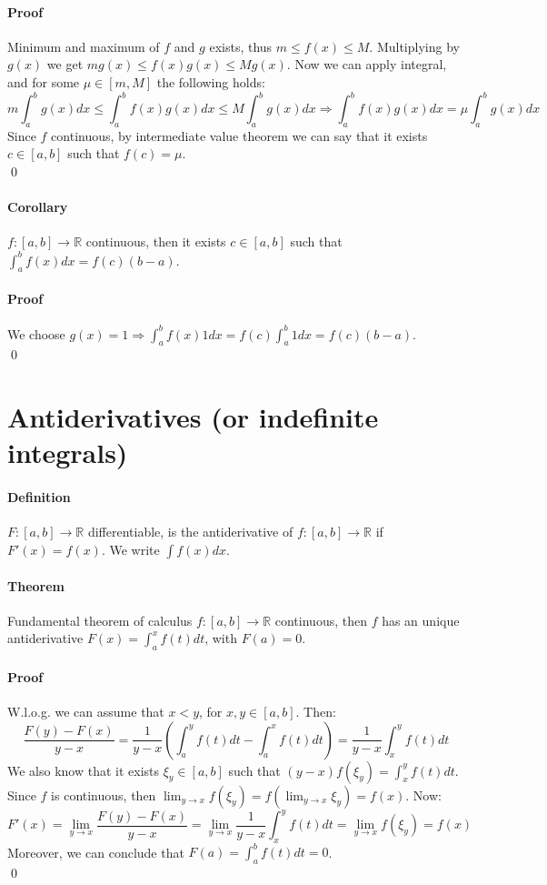 \documentclass{article}
\newcommand{\DS}{\displaystyle}
\newcommand{\functoR}[2]{#1 : #2 \rightarrow \mathbb{R}}
\newcommand{\intcc}[1]{\left[#1\right]}
\newcommand{\Def}{\paragraph{Definition}}
\newcommand{\Theorem}{\paragraph{Theorem}}
\newcommand{\Corollary}{\paragraph{Corollary}}
\newcommand{\Proof}{\paragraph{Proof}}
\begin{document}
  \Proof Minimum and maximum of $f$ and $g$ exists, thus $m \leq f(x) \leq M$.
  Multiplying by $g(x)$ we get $mg(x) \leq f(x)g(x) \leq Mg(x)$. Now we can
  apply integral, and for some $\mu \in \intcc{m,M}$ the following holds:
  \begin{equation*}
    m \int_a^b g(x) dx \leq \int_a^b f(x)g(x) dx \leq M \int_a^b g(x) dx
    \Rightarrow \int_a^b f(x)g(x) dx = \mu \int_a^b g(x) dx
  \end{equation*}
  Since $f$ continuous, by intermediate value theorem we can say that it exists
  $c \in \intcc{a,b}$ such that $f(c) = \mu$.
\\\qed

  \Corollary $\functoR{f}{\intcc{a,b}}$ continuous, then it exists $c \in
  \intcc{a,b}$ such that $\int_a^b f(x) dx = f(c) (b-a)$.

  \Proof We choose $g(x) = 1 \Rightarrow \int_a^b f(x) 1 dx = f(c) \int_a^b
  1 dx = f(c) (b-a)$.
\\\qed

\section{Antiderivatives (or indefinite integrals)}

  \Def $\functoR{F}{\intcc{a,b}}$ differentiable, is the antiderivative of
  $\functoR{f}{\intcc{a,b}}$ if $F'(x) = f(x)$. We write $\int f(x) dx$.

  \Theorem Fundamental theorem of calculus
  $\functoR{f}{\intcc{a,b}}$ continuous, then $f$ has an unique antiderivative
  $F(x) = \int_a^x f(t) dt$, with $F(a) = 0$.

  \Proof W.l.o.g. we can assume that $x < y$, for $x,y \in \intcc{a,b}$. Then:
  \begin{equation*}
    \frac{F(y)-F(x)}{y-x} =
    \frac{1}{y-x}\left(\int_a^y f(t) dt - \int_a^x f(t) dt\right) =
    \frac{1}{y-x} \int_x^y f(t) dt
  \end{equation*}
  We also know that it exists $\xi_y \in \intcc{a,b}$ such that $(y-x) f(\xi_y)
  = \int_x^y f(t) dt$. Since $f$ is continuous, then $\DS \lim_{y \to x} f(\xi_y)
  = f(\lim_{y \to x} \xi_y) = f(x)$. Now:
  \begin{equation*}
    F'(x) =
    \lim_{y \to x} \frac{F(y)-F(x)}{y-x} =
    \lim_{y \to x} \frac{1}{y-x} \int_x^y f(t) dt =
    \lim_{y \to x} f(\xi_y) = f(x)
  \end{equation*}
  Moreover, we can conclude that $F(a) = \int_a^b f(t) dt = 0$.
\\\qed
\end{document}
